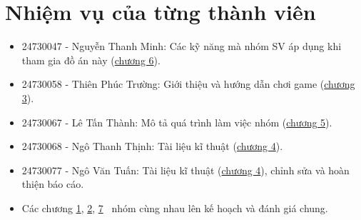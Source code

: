 \documentclass[12pt]{report}
\begin{document}
\section{Nhiệm vụ của từng thành viên}
\begin{itemize}
    \item 24730047 - Nguyễn Thanh Minh: Các kỹ năng mà nhóm SV áp dụng khi tham gia đồ án này (\hyperref[sec:used_skills]{chương 6}).
    \item 24730058 - Thiên Phúc Trường: Giới thiệu và hướng dẫn chơi game (\hyperref[sec:game_tutorial]{chương 3}).
    \item 24730067 - Lê Tấn Thành: Mô tả quá trình làm việc nhóm (\hyperref[sec:game_tutorial]{chương 5}).
    \item 24730068 - Ngô Thanh Thịnh: Tài liệu kĩ thuật (\hyperref[sec:technical_detail]{chương 4}).
    \item 24730077 - Ngô Văn Tuấn: Tài liệu kĩ thuật (\hyperref[sec:technical_detail]{chương 4}), chỉnh sửa và hoàn thiện báo cáo.

    \item Các chương \hyperref[sec:group_contract]{1}, \hyperref[sec:work_space]{2}, \hyperref[sec:member_ratings]{7} \
          nhóm cùng nhau lên kế hoạch và đánh giá chung.
\end{itemize}
\end{document}
